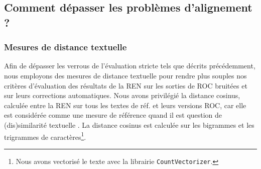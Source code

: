 \subsection{Comment dépasser les problèmes d'alignement ?}
\label{subsec:ditances_creux_COR-OCR-IMPACT-NER}
\subsubsection{Mesures de distance textuelle}

Afin de dépasser les verrous de l'évaluation stricte tels que décrits précédemment, nous employons des mesures de distance textuelle pour rendre plus souples nos critères d'évaluation des résultats de la REN sur les sorties de ROC bruitées et sur leurs corrections automatiques. Nous avons privilégié la distance
cosinus, calculée entre la REN sur tous les textes de réf. et leurs versions ROC, car elle est considérée comme une mesure de référence quand il est question de (dis)similarité textuelle \cite{buscaldi2020calcul}. La distance cosinus est calculée sur les bigrammes et les trigrammes de caractères\footnote{Nous avons vectorisé le texte avec la librairie \texttt{CountVectorizer}.}. 
